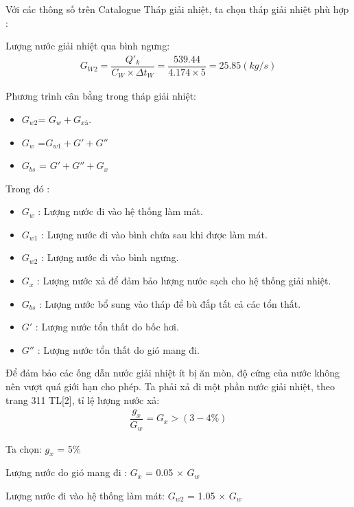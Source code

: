 Với các thông số trên Catalogue Tháp giải nhiệt, ta chọn tháp giải nhiệt phù hợp : 

Lượng nước giải nhiệt qua bình ngưng:
\begin{equation*}
	\begin{split}
		G_{W2} = \dfrac{Q'_{k}}{C_{W} \times \Delta t_{W}}= \dfrac{539.44}{4.174 \times 5}=25.85(kg/s)
	\end{split}
\end{equation*}

Phương trình cân bằng trong tháp giải nhiệt:
\begin{itemize}
	\item $G_{w2}$= $G_{w} + G_{xả}$.
	\item $G_{w}$ =$ G_{w1} + G' + G''$
	\item $G_{bs}$ = $G' + G'' + G_{x}$
\end{itemize}

Trong đó :
\begin{itemize}
	\item $G_{w}$ : Lượng nước đi vào hệ thống làm mát.
	\item $G_{w1}$ : Lượng nước đi vào bình chứa sau khi được làm mát.
	\item $G_{w2}$ : Lượng nước đi vào bình ngưng.
	\item $G_{x}$ : Lượng nước xả để đảm bảo lượng nước sạch cho hệ thống giải nhiệt.
	\item $G_{bs}$ : Lượng nước bổ sung vào tháp để bù đắp tất cả các tổn thất.
	\item $G'$ : Lượng nước tổn thất do bốc hơi.
	\item $G''$ : Lượng nước tổn thất do gió mang đi.
\end{itemize}

Để đảm bảo các ống dẫn nước giải nhiệt ít bị ăn mòn, độ cứng của nước không nên vượt quá giới hạn cho phép. Ta phải xả đi một phần nước giải nhiệt, theo trang 311 TL[2], tỉ lệ lượng nước xả:
\begin{equation*}
  \begin{split}
  	\dfrac{g_{x}}{G_{w}} = G_{x} > (3 - 4 \% )
  \end{split}	
\end{equation*}

\newpage

Ta chọn: $g_{x}$ = 5\%

Lượng nước do gió mang đi : $G_{x}$ = 0.05 $\times$ $G_{w}$

Lượng nước đi vào hệ thống làm mát: $G_{w2}$ = 1.05 $\times$ $G_{w}$

